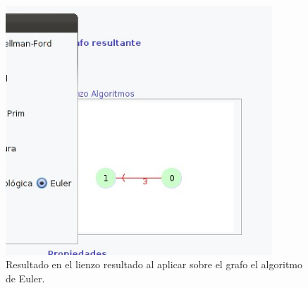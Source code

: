 \begin{figure}[H]
\begin{center}
\includegraphics[width=10cm]{./imagenes_documentacion/imagen_euler.jpeg}
\caption{Resultado en el lienzo resultado al aplicar sobre el grafo el algoritmo de Euler.}
\end{center}
\end{figure}

